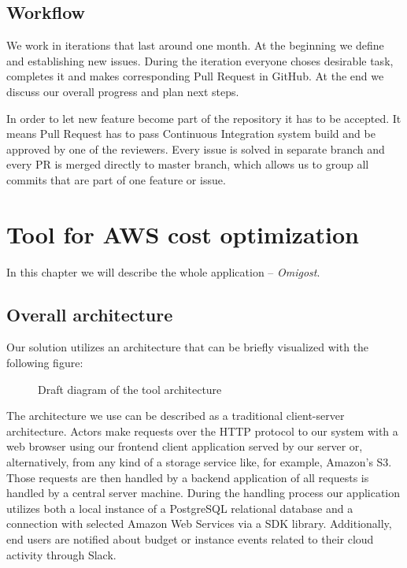 \documentclass[licencjacka,en]{thesisclass}
\begin{document}
    \section{Workflow}

    We work in iterations that last around one month. At the beginning we define and establishing new issues. During the iteration everyone choses desirable task, completes it and makes corresponding Pull Request in GitHub. At the end we discuss our overall progress and plan next steps.

    In order to let new feature become part of the repository it has to be accepted. It means Pull Request has to pass Continuous Integration system build and be approved by one of the reviewers.
    Every issue is solved in separate branch and every PR is merged directly to master branch, which allows us to group all commits that are part of one feature or issue.


    \chapter{Tool for AWS cost optimization}

    In this chapter we will describe the whole application -- \textit{Omigost}.

    \section{Overall architecture}
    Our solution utilizes an architecture that can be briefly visualized with the following figure:

    \begin{figure}[!htb]
      \caption{\label{fig:arch-diag} Draft diagram of the tool architecture}
    \end{figure}

    The architecture we use can be described as a traditional client-server architecture.
    Actors make requests over the HTTP protocol to our system with a web browser using our frontend client application
    served by our server or, alternatively, from any kind of a storage service like, for example, Amazon's S3.
    Those requests are then handled by a backend application of all requests is handled by a central server machine.
    During the handling process our application utilizes both a local instance of a PostgreSQL relational database
    and a connection with selected Amazon Web Services via a SDK library.
    Additionally, end users are notified about budget or instance events related to their cloud activity through Slack.
\end{document}
